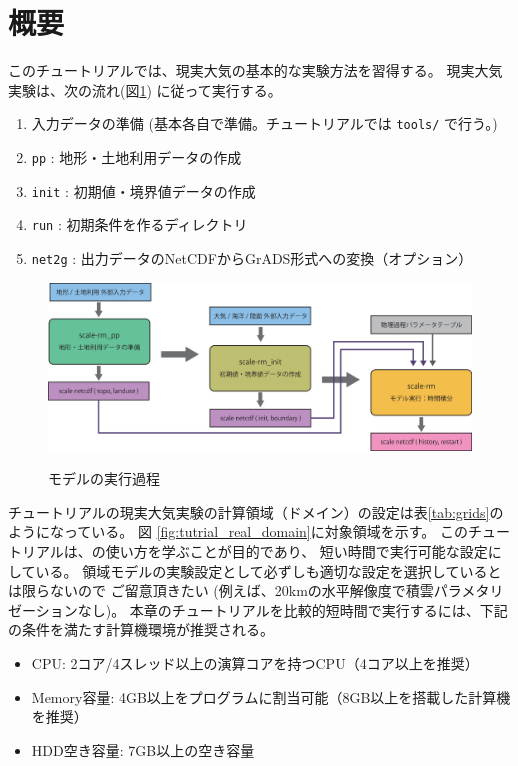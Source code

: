 \section{概要} \label{sec:tutrial_real_intro}
このチュートリアルでは、現実大気の基本的な実験方法を習得する。
現実大気実験は、次の流れ(図\ref{fig:howto}) に従って実行する。
\begin{enumerate}
\item  入力データの準備 (基本各自で準備。チュートリアルでは \verb|tools/| で行う。)
\item  \texttt{pp}      : 地形・土地利用データの作成
\item  \texttt{init}    : 初期値・境界値データの作成
\item  \texttt{run}     : 初期条件を作るディレクトリ
\item  \texttt{net2g}   : 出力データのNetCDFからGrADS形式への変換（オプション） 
\end{enumerate}

\begin{figure}[b]
\begin{center}
  \includegraphics[width=0.9\hsize]{./figure/real_procedure.eps}\\
  \caption{\scalerm モデルの実行過程}
  \label{fig:howto}
\end{center}
\end{figure}


チュートリアルの現実大気実験の計算領域（ドメイン）の設定は表\ref{tab:grids}のようになっている。
図 \ref{fig:tutrial_real_domain}に対象領域を示す。
このチュートリアルは、\scalerm の使い方を学ぶことが目的であり、
短い時間で実行可能な設定にしている。
領域モデルの実験設定として必ずしも適切な設定を選択しているとは限らないので
ご留意頂きたい
(例えば、20kmの水平解像度で積雲パラメタリゼーションなし)。
本章のチュートリアルを比較的短時間で実行するには、下記の条件を満たす計算機環境が推奨される。
\begin{itemize}
\item CPU: 2コア/4スレッド以上の演算コアを持つCPU（4コア以上を推奨）
\item Memory容量: 4GB以上をプログラムに割当可能（8GB以上を搭載した計算機を推奨）
\item HDD空き容量: 7GB以上の空き容量
\end{itemize}


